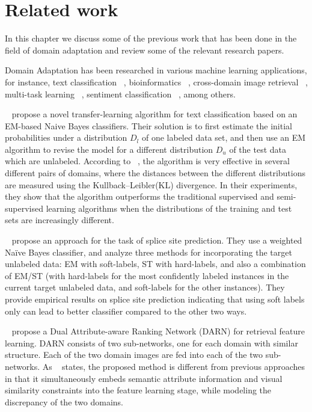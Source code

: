 \cleardoublepage

\chapter{Related work}
\label{relatedworkchapter}

In this chapter we discuss some of the previous work that has been done in the field of domain adaptation and review some of the relevant research papers.

Domain Adaptation has been researched in various machine learning applications, for instance, text classification ~\citep{dai}, bioinformatics ~\citep{eval}, cross-domain image retrieval ~\citep{crossdomimage}, multi-task learning ~\citep{multitaskdeep}, sentiment classification ~\citep{sentmulti}, among others. 

~\citet{dai} propose a novel transfer-learning algorithm for text classification based on an EM-based Naive Bayes classifiers. Their solution is to first estimate the initial probabilities under a distribution $D_l$ of one labeled data set, and then use an EM algorithm to revise the model for a different distribution $D_u$ of the test data which are unlabeled. According to ~\citep{dai}, the algorithm is very effective in several different pairs of domains, where the distances between the different distributions are measured using the Kullback--Leibler(KL) divergence. In their experiments, they show that the algorithm outperforms the traditional supervised and semi-supervised learning algorithms when the distributions of the training and test sets are increasingly different.

~\citet{eval} propose an approach for the task of splice site prediction. They use a weighted Naïve Bayes classifier, and analyze three methods for incorporating the target unlabeled data: EM with soft-labels, ST with hard-labels, and also a combination of EM/ST (with hard-labels for the most confidently labeled instances in the current target unlabeled data, and soft-labels for the other instances). They provide empirical results on splice site prediction indicating that using soft labels only can lead to better classifier compared to the other two ways.

~\citet{crossdomimage} propose a Dual Attribute-aware Ranking Network (DARN) for retrieval feature learning. DARN consists of two sub-networks, one for each domain with similar structure. Each of the two domain images are fed into each of the two sub-networks. As ~\citet{crossdomimage} states, the proposed method is different from previous approaches in that it simultaneously embeds semantic attribute information and visual similarity constraints into the feature learning stage, while modeling the discrepancy of the two domains. 


